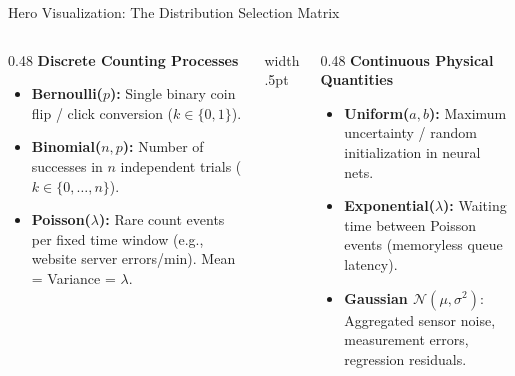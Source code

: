 \documentclass[../m00-session-03.tex]{subfiles}
\begin{document}
\begin{frame}{Hero Visualization: The Distribution Selection Matrix}
  \begin{columns}[T,onlytextwidth]
    \begin{column}{0.48\textwidth}
      {\small\bfseries\color{UpGradRed}Discrete Counting Processes}\par\vspace{0.06cm}
      \begin{itemize}\setlength{\itemsep}{0.22em}\small
        \item \textbf{Bernoulli($p$):} Single binary coin flip / click conversion ($k \in \{0, 1\}$).
        \item \textbf{Binomial($n, p$):} Number of successes in $n$ independent trials ($k \in \{0, \dots, n\}$).
        \item \textbf{Poisson($\lambda$):} Rare count events per fixed time window (e.g., website server errors/min). Mean = Variance = $\lambda$.
      \end{itemize}
    \end{column}
    \hfill{\color{UpGradRule}\vrule width .5pt}\hfill
    \begin{column}{0.48\textwidth}
      {\small\bfseries\color{AWSBlue}Continuous Physical Quantities}\par\vspace{0.06cm}
      \begin{itemize}\setlength{\itemsep}{0.22em}\small
        \item \textbf{Uniform($a, b$):} Maximum uncertainty / random initialization in neural nets.
        \item \textbf{Exponential($\lambda$):} Waiting time between Poisson events (memoryless queue latency).
        \item \textbf{Gaussian $\mathcal{N}(\mu, \sigma^2)$}: Aggregated sensor noise, measurement errors, regression residuals.
      \end{itemize}
      \vspace{0.04cm}
    \end{column}
  \end{columns}
\end{frame}
\end{document}
